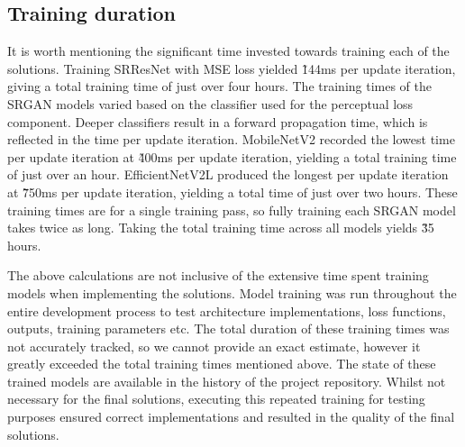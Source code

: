 \subsection{Training duration}
It is worth mentioning the significant time invested towards training each of the solutions. Training SRResNet with MSE loss yielded \~144ms per update iteration, giving a total training time of just over four hours. The training times of the SRGAN models varied based on the classifier used for the perceptual loss component. Deeper classifiers result in a forward propagation time, which is reflected in the time per update iteration. MobileNetV2 recorded the lowest time per update iteration at \~400ms per update iteration, yielding a total training time of just over an hour. EfficientNetV2L produced the longest per update iteration at \~750ms per update iteration, yielding a total time of just over two hours. These training times are for a single training pass, so fully training each SRGAN model takes twice as long. Taking the total training time across all models yields \~35 hours.

The above calculations are not inclusive of the extensive time spent training models when implementing the solutions. Model training was run throughout the entire development process to test architecture implementations, loss functions, outputs, training parameters etc. The total duration of these training times was not accurately tracked, so we cannot provide an exact estimate, however it greatly exceeded the total training times mentioned above. The state of these trained models are available in the history of the project repository. Whilst not necessary for the final solutions, executing this repeated training for testing purposes ensured correct implementations and resulted in the quality of the final solutions. 

